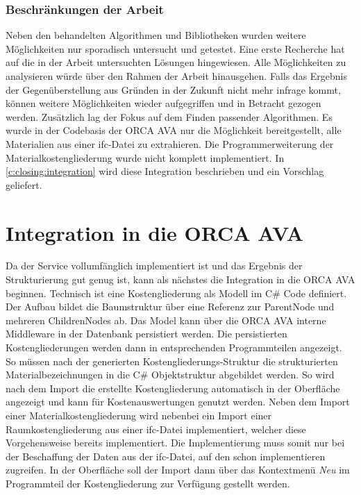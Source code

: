 \subsubsection{Beschränkungen der Arbeit}
Neben den behandelten Algorithmen und Bibliotheken wurden weitere Möglichkeiten nur sporadisch untersucht und getestet. Eine erste Recherche hat auf die in der Arbeit untersuchten Lösungen hingewiesen. Alle Möglichkeiten zu analysieren würde über den Rahmen der Arbeit hinausgehen. Falls das Ergebnis der Gegenüberstellung aus Gründen in der Zukunft nicht mehr infrage kommt, können weitere Möglichkeiten wieder aufgegriffen und in Betracht gezogen werden. Zusätzlich lag der Fokus auf dem Finden passender Algorithmen. Es wurde in der Codebasis der ORCA AVA nur die Möglichkeit bereitgestellt, alle Materialien aus einer \ac{ifc}-Datei zu extrahieren. Die Programmerweiterung der Materialkostengliederung wurde nicht komplett implementiert. In \autoref{c:closing:integration} wird diese Integration beschrieben und ein Vorschlag geliefert.

\section{Integration in die ORCA AVA}
\label{c:closing:integration}
Da der Service vollumfänglich implementiert ist und das Ergebnis der Strukturierung gut genug ist, kann als nächstes die Integration in die ORCA AVA beginnen. Technisch ist eine Kostengliederung als Modell im C\# Code definiert. Der Aufbau bildet die Baumstruktur über eine Referenz zur ParentNode und mehreren ChildrenNodes ab. Das Model kann über die ORCA AVA interne Middleware in der Datenbank persistiert werden. Die persistierten Kostengliederungen werden dann in entsprechenden Programmteilen angezeigt. So müssen nach der generierten Kostengliederungs-Struktur die strukturierten Materialbezeichnungen in die C\# Objektstruktur abgebildet werden. So wird nach dem Import die erstellte Kostengliederung automatisch in der Oberfläche angezeigt und kann für Kostenauswertungen genutzt werden. Neben dem Import einer Materialkostengliederung wird nebenbei ein Import einer Raumkostengliederung aus einer \ac{ifc}-Datei implementiert, welcher diese Vorgehensweise bereits implementiert. Die Implementierung muss somit nur bei der Beschaffung der Daten aus der \ac{ifc}-Datei, auf den schon implementieren  zugreifen. In der Oberfläche soll der Import dann über das Kontextmenü \textit{Neu} im Programmteil der Kostengliederung zur Verfügung gestellt werden. 

